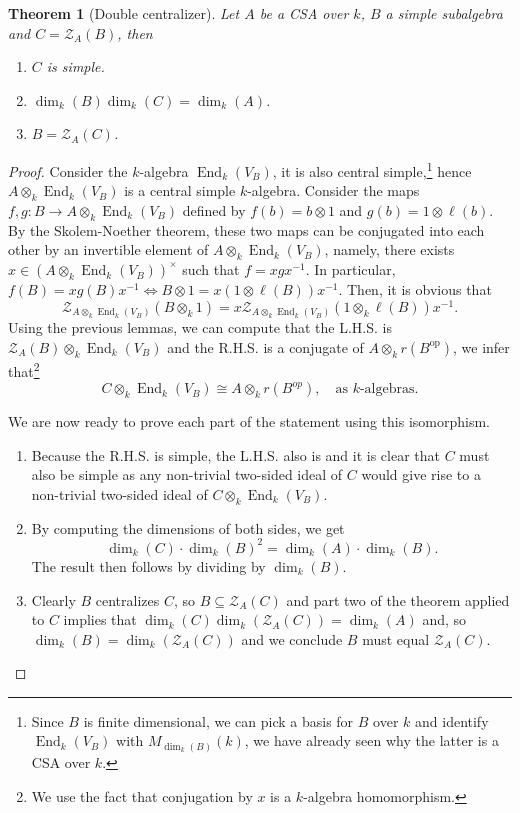 \documentclass{tufte-handout} %
\newtheorem{thm}{Theorem}
\theoremstyle{definition}
\theoremstyle{remark}
\newcommand{\op}[1]{#1^{\text{op}}}
\newcommand{\mZ}{\mathcal{Z}}
\DeclareMathOperator{\End}{End}
\begin{document}
\begin{thm}[Double centralizer]\label{doublecent}
	Let $A$ be a CSA over $k$, $B$ a simple subalgebra and $C = \mZ_A(B)$, then \begin{enumerate}
		\item $C$ is simple.
		\item $\dim_k(B) \dim_k(C) = \dim_k(A)$.
		\item $B = \mZ_A(C)$.
	\end{enumerate}
\end{thm}
\begin{proof}[Proof]
	Consider the $k$-algebra $\End_k(V_B)$, it is also central simple,\footnote{Since $B$ is finite dimensional, we can pick a basis for $B$ over $k$ and identify $\End_k(V_B)$ with $M_{\dim_k(B)}(k)$, we have already seen why the latter is a CSA over $k$.} hence $A \otimes_k \End_k(V_B)$ is a central simple $k$-algebra. Consider the maps $f,g: B \rightarrow A \otimes_k \End_k(V_B)$ defined by $f(b) = b \otimes 1$ and $g(b) = 1 \otimes \ell(b)$. By the Skolem-Noether theorem, these two maps can be conjugated into each other by an invertible element of $A \otimes_k \End_k(V_B)$, namely, there exists $x \in (A \otimes_k \End_k(V_B))^{\times}$ such that $f = xgx^{-1}$. In particular, $f(B) = xg(B)x^{-1} \Leftrightarrow B \otimes 1 = x(1 \otimes \ell(B))x^{-1}$. Then, it is obvious that \[\mZ_{A \otimes_k \End_k(V_B)}(B \otimes_k 1) = x\mZ_{A \otimes_k \End_k(V_B)}(1 \otimes_k \ell(B))x^{-1}.\]	
	Using the previous lemmas, we can compute that the L.H.S. is $\mZ_A(B) \otimes_k \End_k(V_B)$ and the R.H.S. is a conjugate of $A \otimes_k r(\op{B})$, we infer that\footnote{We use the fact that conjugation by $x$ is a $k$-algebra homomorphism.}
	\[C \otimes_k \End_k(V_B) \cong A \otimes_k r(B^{op}), \quad \text{as $k$-algebras.}\]
	
	We are now ready to prove each part of the statement using this isomorphism.
	\begin{enumerate}
		\item Because the R.H.S. is simple, the L.H.S. also is and it is clear that $C$ must also be simple as any non-trivial two-sided ideal of $C$ would give rise to a non-trivial two-sided ideal of $C \otimes_k \End_k(V_B)$.
		\item By computing the dimensions of both sides, we get 
		\[\dim_k(C) \cdot \dim_k(B)^2 = \dim_k(A) \cdot \dim_k(B).\]The result then follows by dividing by $\dim_k(B)$.
		\item Clearly $B$ centralizes $C$, so $B\subseteq \mZ_A(C)$ and part two of the theorem applied to $C$ implies that $\dim_k(C) \dim_k(\mZ_A(C)) = \dim_k(A)$ and, so $\dim_k(B) = \dim_k(\mZ_A(C))$ and we conclude $B$ must equal $\mZ_A(C)$.
	\end{enumerate}
\end{proof}
\end{document}
